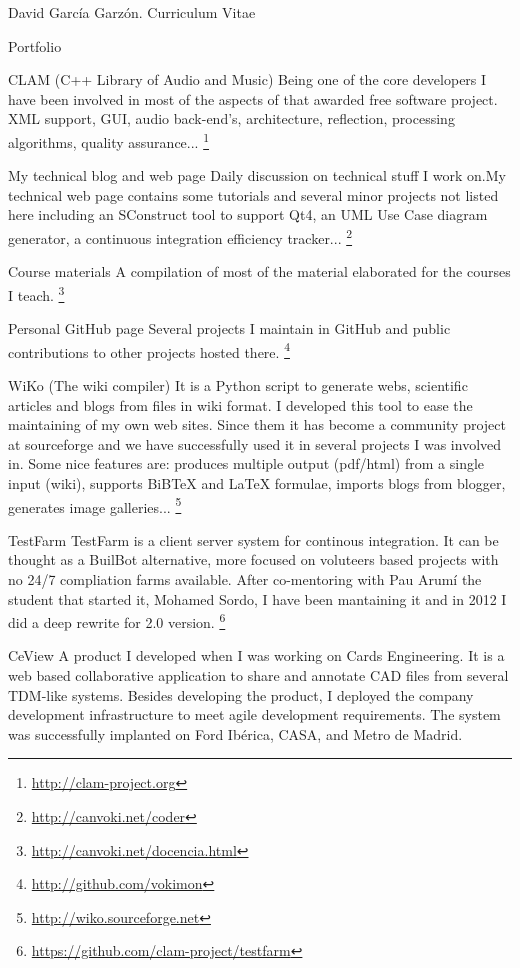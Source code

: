 \documentclass{article}
\begin{document}
\begin{cv}{David García Garzón. Curriculum Vitae}
\begin{cvlist}{Portfolio}
\item[CLAM (C++ Library of Audio and Music)]
Being one of the core developers I have been involved in most of the aspects of that awarded free software project. XML support, GUI, audio back-end's, architecture, reflection, processing algorithms, quality assurance...
\footnote{\href{http://clam-project.org}{http://clam-project.org}}
\item[My technical blog and web page]
Daily discussion on technical stuff I work on.My technical web page contains some tutorials and several minor projects not listed here including an SConstruct tool to support Qt4, an UML Use Case diagram generator, a continuous integration efficiency tracker...
\footnote{\href{http://canvoki.net/coder}{http://canvoki.net/coder}}
\item[Course materials]
A compilation of most of the material elaborated for the courses I teach.
\footnote{\href{http://canvoki.net/docencia.html}{http://canvoki.net/docencia.html}}
\item[Personal GitHub page]
Several projects I maintain in GitHub and public contributions to other projects hosted there.
\footnote{\href{http://github.com/vokimon}{http://github.com/vokimon}}
\item[WiKo (The wiki compiler)]
It is a Python script to generate webs, scientific articles and blogs from files in wiki format. I developed this tool to ease the maintaining of my own web sites. Since them it has become a community project at sourceforge and we have successfully used it in several projects I was involved in. Some nice features are: produces multiple output (pdf/html) from a single input (wiki), supports BiBTeX and LaTeX formulae, imports blogs from blogger, generates image galleries... 
\footnote{\href{http://wiko.sourceforge.net}{http://wiko.sourceforge.net}}
\item[TestFarm]
TestFarm is a client server system for continous integration. It can be thought as a BuilBot alternative, more focused on voluteers based projects with no 24/7 compliation farms available. After co-mentoring with Pau Arumí the student that started it, Mohamed Sordo, I have been mantaining it and in 2012 I did a deep rewrite for 2.0 version.
\footnote{\href{https://github.com/clam-project/testfarm}{https://github.com/clam-project/testfarm}}
\item[CeView]
A product I developed when I was working on Cards Engineering. It is a web based collaborative application to share and annotate CAD files from several TDM-like systems. Besides developing the product, I deployed the company development infrastructure to meet agile development requirements. The system was successfully implanted on Ford Ibérica, CASA, and Metro de Madrid. 

\end{cvlist}
\end{cv}
\end{document}
